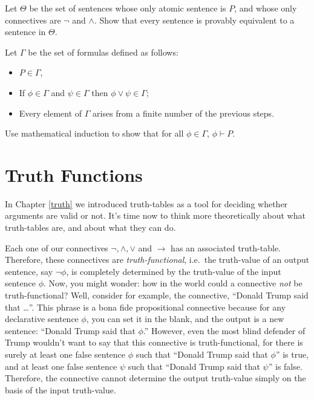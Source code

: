 \begin{exercise} Let $\Theta$ be the set of sentences whose only
  atomic sentence is $P$, and whose only connectives are $\neg$ and
  $\wedge$.  Show that every sentence is provably equivalent to a
  sentence in $\Theta$. \end{exercise}

\begin{exercise} Let $\Gamma$ be the set of formulas defined as follows:
  \begin{itemize}
  \item $P\in \Gamma$,
  \item If $\phi\in\Gamma$ and $\psi\in\Gamma$ then
    $\phi\vee\psi\in\Gamma$;
  \item Every element of $\Gamma$ arises from a finite number of the
    previous steps.
  \end{itemize} Use mathematical induction to show that for all
  $\phi\in\Gamma$, $\phi\vdash P$.
\end{exercise}  


\section{Truth Functions}

In Chapter \ref{truth} we introduced truth-tables as a tool for
deciding whether arguments are valid or not.  It's time now to think
more theoretically about what truth-tables are, and about what they
can do.

Each one of our connectives $\neg ,\wedge ,\vee$ and $\to$ has an
associated truth-table.  Therefore, these connectives are
\emph{\gls{truth-functional}}, i.e.\ the truth-value of an output
sentence, say $\neg \phi$, is completely determined by the truth-value
of the input sentence $\phi$.  Now, you might wonder: how in the world
could a connective {\it not} be truth-functional?  Well, consider for
example, the connective, ``Donald Trump said that \dots ''.  This
phrase is a bona fide propositional connective because for any
declarative sentence $\phi$, you can set it in the blank, and the
output is a new sentence: ``Donald Trump said that $\phi$.''  However,
even the most blind defender of Trump wouldn't want to say that this
connective is truth-functional, for there is surely at least one false
sentence $\phi$ such that ``Donald Trump said that $\phi$'' is true,
and at least one false sentence $\psi$ such that ``Donald Trump said
that $\psi$'' is false.  Therefore, the connective cannot determine
the output truth-value simply on the basis of the input truth-value.

